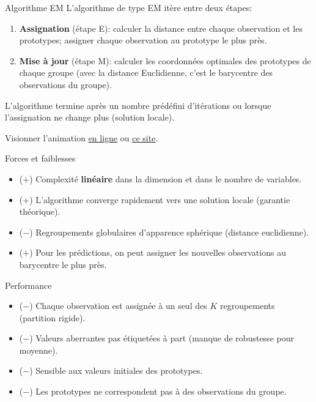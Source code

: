\documentclass[
  ignorenonframetext,
]{beamer}
\providecommand{\tightlist}{%
  \setlength{\itemsep}{0pt}\setlength{\parskip}{0pt}}\usepackage{longtable,booktabs,array}
\begin{document}
\begin{frame}{Algorithme EM}
\protect\hypertarget{algorithme-em}{}
L'algorithme de type EM itère entre deux étapes:

\begin{enumerate}
\tightlist
\item
  \textbf{Assignation} (étape E): calculer la distance entre chaque
  observation et les prototypes; assigner chaque observation au
  prototype le plus près.
\item
  \textbf{Mise à jour} (étape M): calculer les coordonnées optimales des
  prototypes de chaque groupe (avec la distance Euclidienne, c'est le
  barycentre des observations du groupe).
\end{enumerate}

L'algorithme termine après un nombre prédéfini d'itérations ou lorsque
l'assignation ne change plus (solution locale).

Visionner l'animation
\href{https://lbelzile.github.io/math60602/03-regroupements_files/figure-html/fig-kmoy-animation-.gif}{en
ligne} ou
\href{https://www.naftaliharris.com/blog/visualizing-k-means-clustering/}{ce
site}.
\end{frame}

\begin{frame}{Forces et faiblesses}
\protect\hypertarget{forces-et-faiblesses}{}
\begin{itemize}
\tightlist
\item
  (\(+\)) Complexité \textbf{linéaire} dans la dimension et dans le
  nombre de variables.
\item
  (\(+\)) L'algorithme converge rapidement vers une solution locale
  (garantie théorique).
\item
  (\(-\)) Regroupements globulaires d'apparence sphérique (distance
  euclidienne).
\item
  (\(+\)) Pour les prédictions, on peut assigner les nouvelles
  observations au barycentre le plus près.
\end{itemize}
\end{frame}

\begin{frame}{Performance}
\protect\hypertarget{performance}{}
\begin{itemize}
\tightlist
\item
  (\(-\)) Chaque observation est assignée à un seul des \(K\)
  regroupements (partition rigide).
\item
  (\(-\)) Valeurs aberrantes pas étiquetées à part (manque de robustesse
  pour moyenne).
\item
  (\(-\)) Sensible aux valeurs initiales des prototypes.
\item
  (\(-\)) Les prototypes ne correspondent pas à des observations du
  groupe.
\end{itemize}
\end{frame}
\end{document}
